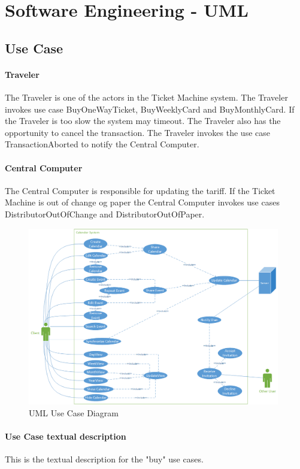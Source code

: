 



\chapter*{Software Engineering - UML}

\section*{Use Case}

\subsubsection{Traveler}
The Traveler is one of the actors in the Ticket Machine system. The Traveler invokes use case BuyOneWayTicket, BuyWeeklyCard and BuyMonthlyCard. If the Traveler is too slow the system may timeout. The Traveler also has the opportunity to cancel the transaction. The Traveler invokes the use case TransactionAborted to notify the Central Computer.

\subsubsection{Central Computer}
The Central Computer is responsible for updating the tariff. If the Ticket Machine is out of change og paper the Central Computer invokes use cases DistributorOutOfChange and DistributorOutOfPaper.

\begin{figure}[ht!]
\centering
\includegraphics[width=110mm]{usecase.png}
\caption{UML Use Case Diagram \label{overflow}}
\end{figure}


\pagebreak \subsubsection{Use Case textual description}
This is the textual description for the "buy" use cases. 

